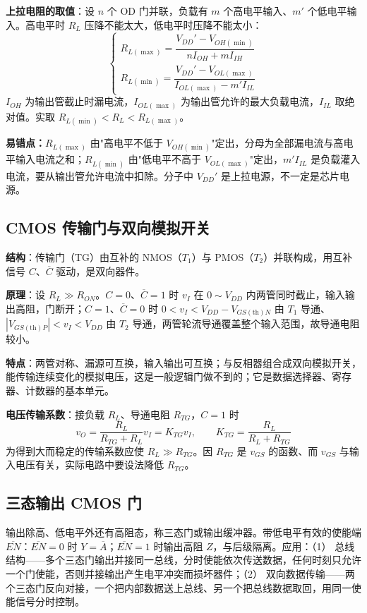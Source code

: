 \textbf{上拉电阻的取值}：设 \(n\) 个 OD 门并联，负载有 \(m\) 个高电平输入、\(m'\) 个低电平输入。高电平时 \(R_L\) 压降不能太大，低电平时压降不能太小：
\[
\begin{cases}
R_{L(\max)}=\dfrac{V_{DD}'-V_{OH(\min)}}{nI_{OH}+mI_{IH}}\\[10pt]
R_{L(\min)}=\dfrac{V_{DD}'-V_{OL(\max)}}{I_{OL(\max)}-m'I_{IL}}
\end{cases}
\]
\(I_{OH}\) 为输出管截止时漏电流，\(I_{OL(\max)}\) 为输出管允许的最大负载电流，\(I_{IL}\) 取绝对值。实取 \(R_{L(\min)}<R_L<R_{L(\max)}\)。

\textbf{易错点：}\(R_{L(\max)}\) 由"高电平不低于 \(V_{OH(\min)}\)"定出，分母为全部漏电流与高电平输入电流之和；\(R_{L(\min)}\) 由"低电平不高于 \(V_{OL(\max)}\)"定出，\(m'I_{IL}\) 是负载灌入电流，要从输出管允许电流中扣除。分子中 \(V_{DD}'\) 是上拉电源，不一定是芯片电源。

\subsection{CMOS 传输门与双向模拟开关}
\textbf{结构}：传输门（TG）由互补的 NMOS（\(T_1\)）与 PMOS（\(T_2\)）并联构成，用互补信号 \(C\)、\(\overline{C}\) 驱动，是双向器件。

\textbf{原理}：设 \(R_L\gg R_{ON}\)。\(C=0\)、\(\overline{C}=1\) 时 \(v_I\) 在 \(0\sim V_{DD}\) 内两管同时截止，输入输出高阻，门断开；\(C=1\)、\(\overline{C}=0\) 时 \(0<v_I<V_{DD}-V_{GS(\mathrm{th})N}\) 由 \(T_1\) 导通、\(|V_{GS(\mathrm{th})P}|<v_I<V_{DD}\) 由 \(T_2\) 导通，两管轮流导通覆盖整个输入范围，故导通电阻较小。

\textbf{特点}：两管对称、漏源可互换，输入输出可互换；与反相器组合成双向模拟开关，能传输连续变化的模拟电压，这是一般逻辑门做不到的；它是数据选择器、寄存器、计数器的基本单元。

\textbf{电压传输系数}：接负载 \(R_L\)、导通电阻 \(R_{TG}\)，\(C=1\) 时
\[
v_O=\frac{R_L}{R_{TG}+R_L}v_I=K_{TG}v_I,\qquad
K_{TG}=\frac{R_L}{R_L+R_{TG}}
\]
为得到大而稳定的传输系数应使 \(R_L\gg R_{TG}\)。因 \(R_{TG}\) 是 \(v_{GS}\) 的函数、而 \(v_{GS}\) 与输入电压有关，实际电路中要设法降低 \(R_{TG}\)。

\subsection{三态输出 CMOS 门}
输出除高、低电平外还有高阻态，称三态门或输出缓冲器。带低电平有效的使能端 \(\overline{EN}\)：\(\overline{EN}=0\) 时 \(Y=\overline{A}\)；\(\overline{EN}=1\) 时输出高阻 \(Z\)，与后级隔离。应用：（1） 总线结构——多个三态门输出并接同一总线，分时使能依次传送数据，任何时刻只允许一个门使能，否则并接输出产生电平冲突而损坏器件；（2） 双向数据传输——两个三态门反向对接，一个把内部数据送上总线、另一个把总线数据取回，用同一使能信号分时控制。

